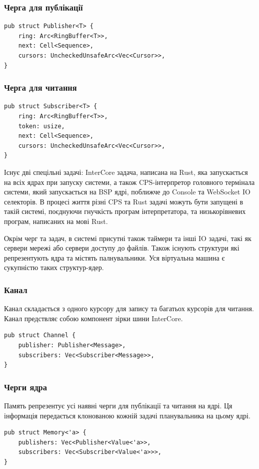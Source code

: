 \documentclass{article}
\begin{document}
\subsubsection{Черга для публікації}
\begin{lstlisting}
pub struct Publisher<T> {
    ring: Arc<RingBuffer<T>>,
    next: Cell<Sequence>,
    cursors: UncheckedUnsafeArc<Vec<Cursor>>,
}
\end{lstlisting}

\subsubsection{Черга для читання}
\begin{lstlisting}
pub struct Subscriber<T> {
    ring: Arc<RingBuffer<T>>,
    token: usize,
    next: Cell<Sequence>,
    cursors: UncheckedUnsafeArc<Vec<Cursor>>,
}
\end{lstlisting}

Існує дві спецільні задачі: InterCore задача, написана на Rust,
яка запускається на всіх ядрах при запуску системи, а також CPS-інтерпретор
головного термінала системи, який запускається на BSP ядрі, поближче до Console та WebSocket IO селекторів.
В процесі життя різні CPS та Rust задачі можуть бути запущені в такій системі,
поєднуючи гнучкість програм інтерпретатора, та низькорівневих програм, написаних на мові Rust.

Окрім черг та задач, в системі присутні також таймери та інші IO задачі,
такі як сервери мережі або сервери доступу до файлів. Також існують
структури які репрезентують ядра та містять палнувальники.
Уся віртуальна машина є сукупністю таких структур-ядер.

\newpage
\subsubsection{Канал}
Канал складається з одного курсору для запису та багатьох курсорів для читання.
Канал предствляє собою компонент зірки шини InterCore.
\begin{lstlisting}
pub struct Channel {
    publisher: Publisher<Message>,
    subscribers: Vec<Subscriber<Message>>,
}
\end{lstlisting}


\subsubsection{Черги ядра}
Память репрезентує усі наявні черги для публікації та читання на ядрі.
Ця інформація передається клонованою кожній задачі планувальника на цьому ядрі.
\begin{lstlisting}
pub struct Memory<'a> {
    publishers: Vec<Publisher<Value<'a>>,
    subscribers: Vec<Subscriber<Value<'a>>>,
}
\end{lstlisting}
\end{document}
